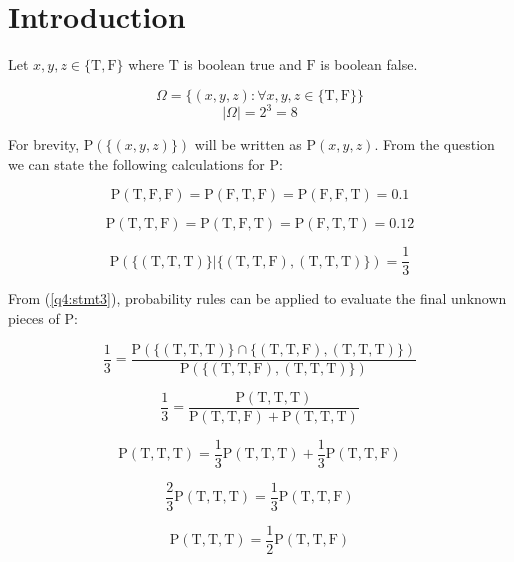 \section{Introduction}

\newcommand{\T}{\mathrm{T}}
\newcommand{\F}{\mathrm{F}}
\newcommand{\implies}{\Longrightarrow}

Let \(x, y, z \in \{ \T, \F \}\) where \( \T \) is boolean true and \( \F \) is boolean false.

\begin{equation}
	\Omega = \{ (x, y, z): \forall x, y, z \in \{ \T, \F \} \}
\end{equation}
\begin{equation}
	| \Omega | = 2 ^ 3 = 8
\end{equation}

For brevity, $\mathrm{P} (\{(x, y, z)\})$ will be written as $\mathrm{P} (x, y, z)$.
From the question we can state the following calculations for $\mathrm{P}$:

\begin{equation} \label{q4:stmt1}
	\mathrm{P} (\T, \F, \F) = \mathrm{P} (\F, \T, \F) = \mathrm{P} (\F, \F, \T) = 0.1
\end{equation}

\begin{equation} \label{q4:stmt2}
\mathrm{P} (\T, \T, \F) = \mathrm{P} (\T, \F, \T) = \mathrm{P} (\F, \T, \T) = 0.12
\end{equation}

\begin{equation} \label{q4:stmt3}
\mathrm{P} ( \{ (\T, \T, \T) \} | \{ (\T, \T, \F), (\T, \T, \T) \}) = \frac{1}{3}
\end{equation}

From (\ref{q4:stmt3}), probability rules can be applied to evaluate the final unknown pieces of $\mathrm{P}$:

\[
\frac{1}{3} = \frac{\mathrm{P} ( \{ (\T, \T, \T) \} \cap \{ (\T, \T, \F), (\T, \T, \T) \} )}{\mathrm{P}( \{ (\T, \T, \F), (\T, \T, \T) \})}
\]

\[
\frac{1}{3} = \frac{\mathrm{P} (\T, \T, \T)}{\mathrm{P}( \T, \T, \F) + \mathrm{P} (\T, \T, \T)}
\]

\[
\mathrm{P} (\T, \T, \T) = \frac{1}{3} \mathrm{P} (\T, \T, \T) + \frac{1}{3} \mathrm{P} (\T, \T, \F)
\]

\[
\frac{2}{3} \mathrm{P} (\T, \T, \T) = \frac{1}{3} \mathrm{P}( \T, \T, \F)
\]

\[
\mathrm{P} (\T, \T, \T) = \frac{1}{2} \mathrm{P}( \T, \T, \F)
\]

